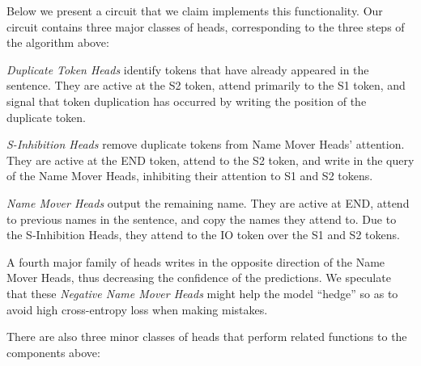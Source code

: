 Below we present a circuit that we claim implements this functionality.
Our circuit contains three major classes of heads, corresponding to the three steps of the algorithm above:
\begin{compactitem}
    \item \emph{Duplicate Token Heads} identify tokens that have already appeared in the sentence. They are active at the S2 token, attend primarily to the S1 token, and signal that token duplication has occurred by writing the position of the duplicate token.
    \item \emph{S-Inhibition Heads} remove duplicate tokens from Name Mover Heads' attention. They are active at the END token, attend to the S2 token, and write in the query of the Name Mover Heads, inhibiting their attention to S1 and S2 tokens.
    \item \emph{Name Mover Heads} output the remaining name. They are active at END, attend to previous names in the sentence, and copy the names they attend to. Due to the S-Inhibition Heads, they attend to the IO token over the S1 and S2 tokens. 
\end{compactitem}
A fourth major family of heads writes in the opposite direction of the Name Mover Heads, thus decreasing the confidence of the predictions. We speculate that these \emph{Negative Name Mover Heads} %
might help the model ``hedge'' so as to avoid high cross-entropy loss when making mistakes. %

There are also three minor classes of heads that perform related functions to the components above:

